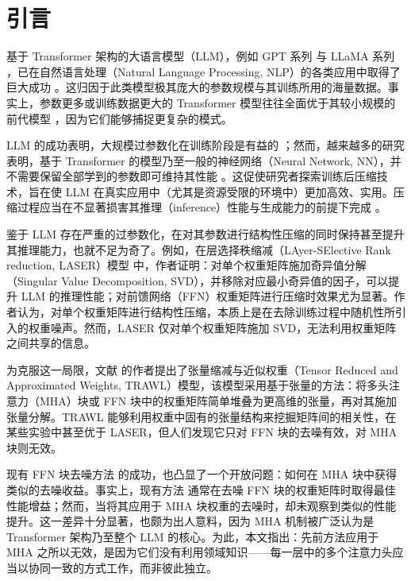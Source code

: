 \documentclass[conference]{IEEEtran}
\begin{document}
\section{引言}
基于 Transformer 架构的大语言模型（LLM），例如 GPT 系列 \cite{ brown2020language, achiam2023gpt} 与 LLaMA 系列 \cite{touvron2023LLaMA, llama2, dubey2024LLaMA}，已在自然语言处理（Natural Language Processing, NLP）的各类应用中取得了巨大成功 \cite{wang-etal-2019-learning-deep, irie19b_interspeech, liu2019text}。这归因于此类模型极其庞大的参数规模与其训练所用的海量数据。事实上，参数更多或训练数据更大的 Transformer 模型往往全面优于其较小规模的前代模型 \cite{brown2020language,touvron2023LLaMA}，因为它们能够捕捉更复杂的模式。\par
LLM 的成功表明，大规模过参数化在训练阶段是有益的 \cite{overparam}；然而，越来越多的研究表明，基于 Transformer 的模型乃至一般的神经网络（Neural Network, NN），并不需要保留全部学到的参数即可维持其性能 \cite{sajjad2023effect, Fan2020Reducing}。这促使研究者探索训练后压缩技术，旨在使 LLM 在真实应用中（尤其是资源受限的环境中）更加高效、实用。压缩过程应当在不显著损害其推理（inference）性能与生成能力的前提下完成 \cite{sharma2023truth,eff_inference_3, calvi2019compression, xu2023tensorgpt}。\par
鉴于 LLM 存在严重的过参数化，在对其参数进行结构性压缩的同时保持甚至提升其推理能力，也就不足为奇了。例如，在层选择秩缩减（LAyer-SElective Rank reduction, LASER）模型 \cite{sharma2023truth} 中，作者证明：对单个权重矩阵施加奇异值分解（Singular Value Decomposition, SVD），并移除对应最小奇异值的因子，可以提升 LLM 的推理性能；对前馈网络（FFN）权重矩阵进行压缩时效果尤为显著。作者认为，对单个权重矩阵进行结构性压缩，本质上是在去除训练过程中随机性所引入的权重噪声。然而，LASER 仅对单个权重矩阵施加 SVD，无法利用权重矩阵之间共享的信息。\par
为克服这一局限，文献 \cite{luo2024trawl} 的作者提出了张量缩减与近似权重（Tensor Reduced and Approximated Weights, TRAWL）模型，该模型采用基于张量的方法：将多头注意力（MHA）块或 FFN 块中的权重矩阵简单堆叠为更高维的张量，再对其施加张量分解。TRAWL 能够利用权重中固有的张量结构来挖掘矩阵间的相关性，在某些实验中甚至优于 LASER，但人们发现它只对 FFN 块的去噪有效，对 MHA 块则无效。\par

现有 FFN 块去噪方法 \cite{sharma2023truth, luo2024trawl} 的成功，也凸显了一个开放问题：如何在 MHA 块中获得类似的去噪收益。事实上，现有方法 \cite{sharma2023truth, luo2024trawl} 通常在去噪 FFN 块的权重矩阵时取得最佳性能增益；然而，当将其应用于 MHA 块权重的去噪时，却未观察到类似的性能提升。这一差异十分显著，也颇为出人意料，因为 MHA 机制被广泛认为是 Transformer 架构乃至整个 LLM 的核心。为此，本文指出：先前方法应用于 MHA 之所以无效，是因为它们没有利用领域知识——每一层中的多个注意力头应当以协同一致的方式工作，而非彼此独立。
\end{document}
